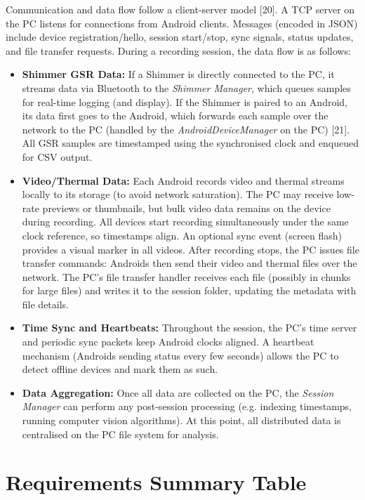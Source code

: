 Communication and data flow follow a client-server model [20]. A TCP server on the PC listens for connections from Android clients. Messages (encoded in JSON) include device registration/hello, session start/stop, sync signals, status updates, and file transfer requests. During a recording session, the data flow is as follows:
\begin{itemize}
	\item \textbf{Shimmer GSR Data:} If a Shimmer is directly connected to the PC, it streams data via Bluetooth to the \textit{Shimmer Manager}, which queues samples for real-time logging (and display). If the Shimmer is paired to an Android, its data first goes to the Android, which forwards each sample over the network to the PC (handled by the \textit{AndroidDeviceManager} on the PC) [21]. All GSR samples are timestamped using the synchronised clock and enqueued for CSV output.
	\item \textbf{Video/Thermal Data:} Each Android records video and thermal streams locally to its storage (to avoid network saturation). The PC may receive low-rate previews or thumbnails, but bulk video data remains on the device during recording. All devices start recording simultaneously under the same clock reference, so timestamps align. An optional sync event (screen flash) provides a visual marker in all videos. After recording stops, the PC issues file transfer commands: Androids then send their video and thermal files over the network. The PC’s file transfer handler receives each file (possibly in chunks for large files) and writes it to the session folder, updating the metadata with file details.
	\item \textbf{Time Sync and Heartbeats:} Throughout the session, the PC’s time server and periodic sync packets keep Android clocks aligned. A heartbeat mechanism (Androids sending status every few seconds) allows the PC to detect offline devices and mark them as such.
	\item \textbf{Data Aggregation:} Once all data are collected on the PC, the \textit{Session Manager} can perform any post-session processing (e.g. indexing timestamps, running computer vision algorithms). At this point, all distributed data is centralised on the PC file system for analysis.
\end{itemize}


\section{Requirements Summary Table}

